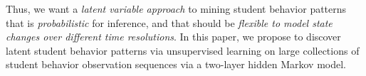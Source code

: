 Thus, we want a \emph{latent variable approach} to mining student behavior
patterns that is \emph{probabilistic} for inference, and that should be
\emph{flexible to model state changes over different time resolutions}. In
this paper, we propose to discover latent student behavior patterns via
unsupervised learning on large collections of student behavior observation
sequences via a two-layer hidden Markov model.
